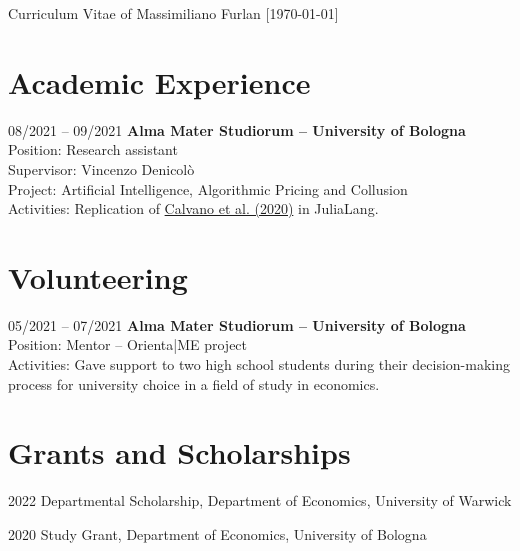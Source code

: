 \documentclass[11pt,a4paper]{article}
\begin{document}
\begin{cv}{\huge Curriculum Vitae of Massimiliano Furlan \normalsize{[\today]}}
\section{Academic Experience}

\begin{cvlist}{}
	\item[08/2021 -- 09/2021]
		\textbf{Alma Mater Studiorum – University of Bologna}\\
		Position: Research assistant\\
		Supervisor: Vincenzo Denicolò\\
		Project: Artificial Intelligence, Algorithmic Pricing and Collusion\\
		Activities: Replication of \href{https://www.aeaweb.org/articles?id=10.1257/aer.20190623}{Calvano et al. (2020)} in JuliaLang.
\end{cvlist}
\vspace{-20pt}

\section{Volunteering}
\begin{cvlist}{}
	\item[05/2021 -- 07/2021]
		\textbf{Alma Mater Studiorum – University of Bologna}\\
		Position: Mentor -- Orienta|ME project\\
		Activities: Gave support to two high school students during their decision-making process for university choice in a field of study in economics.
\end{cvlist}
\vspace{-20pt}

\section{Grants and Scholarships}
\begin{cvlist}{}
	\itemsep -4pt
	\item[2022] Departmental Scholarship, Department of Economics, University of Warwick 
	\item[2020] Study Grant, Department of Economics, University of Bologna
\end{cvlist}



\end{cv}
\end{document}
